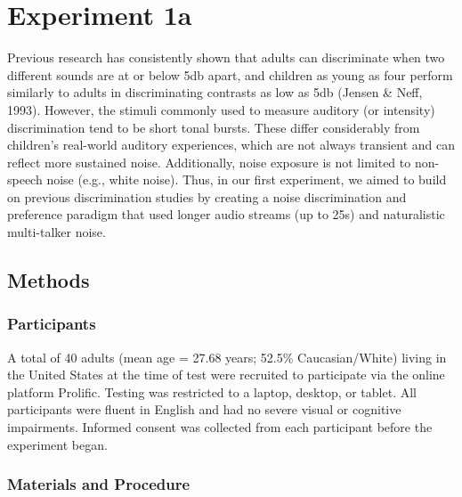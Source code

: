 \documentclass[10pt, letterpaper]{article}
\begin{document}
\hypertarget{experiment-1a}{%
\section{Experiment 1a}\label{experiment-1a}}

Previous research has consistently shown that adults can discriminate
when two different sounds are at or below 5db apart, and children as
young as four perform similarly to adults in discriminating contrasts as
low as 5db (Jensen \& Neff, 1993). However, the stimuli commonly used to
measure auditory (or intensity) discrimination tend to be short tonal
bursts. These differ considerably from children's real-world auditory
experiences, which are not always transient and can reflect more
sustained noise. Additionally, noise exposure is not limited to
non-speech noise (e.g., white noise). Thus, in our first experiment, we
aimed to build on previous discrimination studies by creating a noise
discrimination and preference paradigm that used longer audio streams
(up to 25s) and naturalistic multi-talker noise.

\hypertarget{methods}{%
\subsection{Methods}\label{methods}}

\hypertarget{participants}{%
\subsubsection{Participants}\label{participants}}

A total of 40 adults (mean age = 27.68 years; 52.5\% Caucasian/White)
living in the United States at the time of test were recruited to
participate via the online platform Prolific. Testing was restricted to
a laptop, desktop, or tablet. All participants were fluent in English
and had no severe visual or cognitive impairments. Informed consent was
collected from each participant before the experiment began.

\hypertarget{materials-and-procedure}{%
\subsubsection{Materials and Procedure}\label{materials-and-procedure}}
\end{document}
